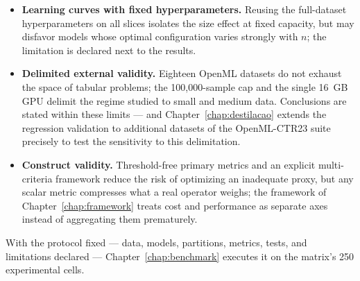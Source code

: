 \begin{itemize}
    stable across datasets (Spearman rank correlation 0.78--0.95)
    and that the foundation models' context dependence has the
    expected sense --- it grows with the context --- (TabPFN: 840
    $\mu$s/row on the smallest
    dataset, 45{,}578 on the largest). The numbers do not transfer
    to single-row online serving or to other hardware; what
    transfers --- and is what the conclusions use --- are the
    orders of magnitude between families.
  \item \textbf{Learning curves with fixed hyperparameters.}
    Reusing the full-dataset hyperparameters on all slices isolates
    the size effect at fixed capacity, but may disfavor models
    whose optimal configuration varies strongly with $n$; the
    limitation is declared next to the results.
  \item \textbf{Delimited external validity.} Eighteen OpenML
    datasets do not exhaust the space of tabular problems; the
    100{,}000-sample cap and the single 16~GB GPU delimit the
    regime studied to small and medium data. Conclusions are stated
    within these limits --- and Chapter~\ref{chap:destilacao}
    extends the regression validation to additional datasets of the
    OpenML-CTR23 suite \citep{fischer2023} precisely to test the
    sensitivity to this delimitation.
  \item \textbf{Construct validity.} Threshold-free primary metrics
    and an explicit multi-criteria framework reduce the risk of
    optimizing an inadequate proxy, but any scalar metric
    compresses what a real operator weighs; the framework of
    Chapter~\ref{chap:framework} treats cost and performance as
    separate axes instead of aggregating them prematurely.
\end{itemize}

With the protocol fixed --- data, models, partitions, metrics,
tests, and limitations declared --- Chapter~\ref{chap:benchmark}
executes it on the matrix's 250 experimental cells.
